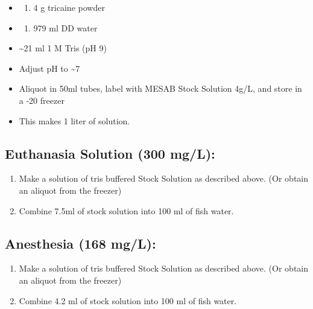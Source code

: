 \documentclass[
]{book}
\providecommand{\tightlist}{%
  \setlength{\itemsep}{0pt}\setlength{\parskip}{0pt}}
\begin{document}
\begin{itemize}
\item
  \begin{enumerate}
  \def\labelenumi{\arabic{enumi}.}
  \tightlist
  \item
    4 g tricaine powder
  \end{enumerate}
\item
  \begin{enumerate}
  \def\labelenumi{\arabic{enumi}.}
  \setcounter{enumi}{1}
  \tightlist
  \item
    979 ml DD water
  \end{enumerate}
\item
  \textasciitilde21 ml 1 M Tris (pH 9)
\item
  Adjust pH to \textasciitilde7\\
\item
  Aliquot in 50ml tubes, label with MESAB Stock Solution 4g/L, and store in a -20 freezer
\item
  This makes 1 liter of solution.
\end{itemize}

\hypertarget{euthanasia-solution-300-mgl}{%
\subsection{Euthanasia Solution (300 mg/L):}\label{euthanasia-solution-300-mgl}}

\begin{enumerate}
\def\labelenumi{\arabic{enumi}.}
\tightlist
\item
  Make a solution of tris buffered Stock Solution as described above. (Or obtain an aliquot from the freezer)
\item
  Combine 7.5ml of stock solution into 100 ml of fish water.
\end{enumerate}

\hypertarget{anesthesia-168-mgl-1}{%
\subsection{Anesthesia (168 mg/L):}\label{anesthesia-168-mgl-1}}

\begin{enumerate}
\def\labelenumi{\arabic{enumi}.}
\tightlist
\item
  Make a solution of tris buffered Stock Solution as described above. (Or obtain an aliquot from the freezer)
\item
  Combine 4.2 ml of stock solution into 100 ml of fish water.
\end{enumerate}
\end{document}
